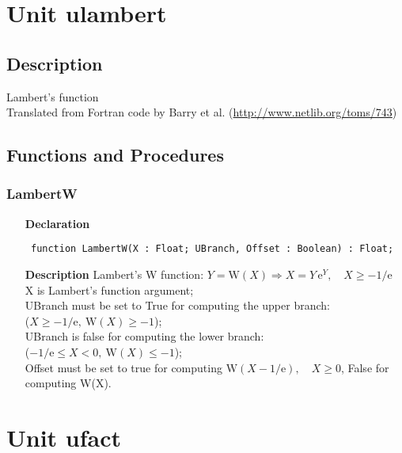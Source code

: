 \documentclass[12pt,a4paper,oneside]{report}
\newcommand{\euler}{\mathrm{e}}
\newcommand{\declarationitem}[1]{\textbf{#1}}
\newcommand{\descriptiontitle}[1]{\textbf{#1}}
\newcommand{\code}[1]{\texttt{#1}}
\begin{document}
\section{Unit ulambert}
\label{ulambert}
\subsection{Description}
Lambert's function \\Translated from Fortran code by Barry et al. (\href{http://www.netlib.org/toms/743}{http://www.netlib.org/toms/743}) 
\subsection{Functions and Procedures}
\subsubsection{LambertW}
\label{ulambert-LambertW}
\begin{itemize}\item[\declarationitem{Declaration}\hfill]
	\begin{flushleft}
		\code{
			function LambertW(X : Float; UBranch, Offset : Boolean) : Float;}
		
	\end{flushleft}
	
	\par
	\item[\descriptiontitle{Description}]
	Lambert's W function: $Y=\textrm{W}(X) \Longrightarrow X=Y\,\euler^Y,\quad X\ge -1/\euler$ \\
	X is Lambert's function argument; \\
	UBranch must be set to True for computing the upper branch:\\
	 ($X\ge-1/\euler,\ \textrm{W}(X) \ge -1$);\\
	UBranch is false for computing the lower branch:\\
	  ($-1/\euler \le X < 0,\ \textrm{W}(X) \le -1$);\\
	Offset must be set to true for computing $\textrm{W}(X - 1/\euler),\quad X\ge 0$,
	False for computing \textrm{W}(X).   
	
\end{itemize}

\section{Unit ufact}
\label{ufact}
\end{document}

